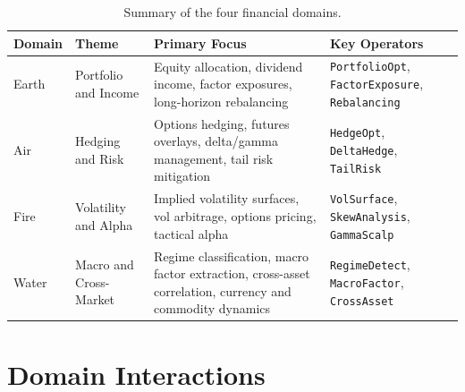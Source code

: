 \documentclass[12pt,openany]{book}
\numberwithin{equation}{chapter}
\theoremstyle{plain}
\theoremstyle{definition}
\theoremstyle{remark}
\begin{document}
\begin{table}[H]
\centering
\caption{Summary of the four financial domains.}
\label{tab:four_domains}
\small
\begin{tabularx}{\textwidth}{p{2.2cm} p{3.0cm} p{4.5cm} p{4.5cm}}
\toprule
\textbf{Domain} & \textbf{Theme} & \textbf{Primary Focus} & \textbf{Key Operators} \\
\midrule
Earth & Portfolio and Income &
    Equity allocation, dividend income, factor exposures, long-horizon rebalancing &
    \texttt{PortfolioOpt}, \texttt{FactorExposure}, \texttt{Rebalancing} \\
\midrule
Air & Hedging and Risk &
    Options hedging, futures overlays, delta/gamma management, tail risk mitigation &
    \texttt{HedgeOpt}, \texttt{DeltaHedge}, \texttt{TailRisk} \\
\midrule
Fire & Volatility and Alpha &
    Implied volatility surfaces, vol arbitrage, options pricing, tactical alpha &
    \texttt{VolSurface}, \texttt{SkewAnalysis}, \texttt{GammaScalp} \\
\midrule
Water & Macro and Cross-Market &
    Regime classification, macro factor extraction, cross-asset correlation,
    currency and commodity dynamics &
    \texttt{RegimeDetect}, \texttt{MacroFactor}, \texttt{CrossAsset} \\
\bottomrule
\end{tabularx}
\end{table}



\section{Domain Interactions}
\end{document}
